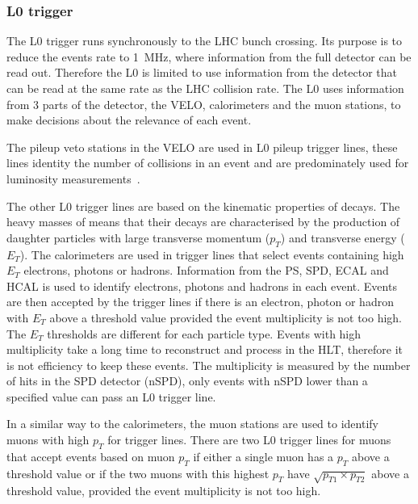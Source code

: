 \subsubsection{L0 trigger}
\label{L0}


The L0 trigger runs synchronously to the LHC bunch crossing. Its purpose is to reduce the events rate to 1~MHz, where information from the full detector can be read out. Therefore the L0 is limited to use information from the detector that can be read at the same rate as the LHC collision rate.
The L0 uses information from 3 parts of the detector, the VELO, calorimeters and the muon stations, to make decisions about the relevance of each event.%


The pileup veto stations in the VELO are used in L0 pileup trigger lines, these lines identity the number of collisions in an event and are predominately used for luminosity measurements~\cite{Aaij:2011er}.

The other L0 trigger lines are based on the kinematic properties of \bhadron decays. The heavy masses of \bhadrons means that their decays are characterised by the production of daughter particles with large transverse momentum ($p_{T}$) and transverse energy ($E_{T}$).
The calorimeters are used in trigger lines that select events containing high $E_{T}$ electrons, photons or hadrons. Information from the PS, SPD, ECAL and HCAL is used to identify electrons, photons and hadrons in each event. Events are then accepted by the trigger lines if there is an electron, photon or hadron with $E_{T}$ above a threshold value provided the event multiplicity is not too high. The $E_{T}$ thresholds are different for each particle type. Events with high multiplicity take a long time to reconstruct and process in the HLT, therefore it is not efficiency to keep these events. The multiplicity is measured by the number of hits in the SPD detector (nSPD), only events with nSPD lower than a specified value can pass an L0 trigger line. 


In a similar way to the calorimeters, the muon stations are used to identify muons with high $p_{T}$ for trigger lines. There are two L0 trigger lines for muons that accept events based on muon $p_{T}$ if either a single muon has a $p_{T}$ above a threshold value or if the two muons with this highest $p_{T}$ have $\sqrt{p_{T1} \times p_{T2}}$ above a threshold value, provided the event multiplicity is not too high. %

